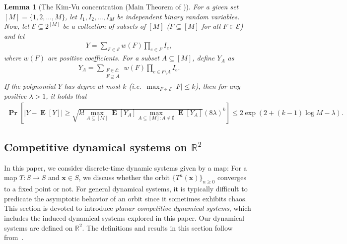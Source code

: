 \documentclass[letterpaper,11pt]{article}
\newtheorem{lemma}[theorem]{Lemma}
\newcommand{\Ind}{I}
\newcommand{\Es}{F}
\renewcommand\Pr{\mathop{\mathbf{Pr}}}
\DeclareMathOperator{\E}{\mathbf{E}}
\begin{document}
\begin{lemma}[The Kim-Vu concentration (Main Theorem of \cite{KV00})] \label{lem:Kim-Vu}
For a given set $[M]=\{1,2, \ldots, M\}$, let $\Ind_1, \Ind_2, \ldots, \Ind_M$ be independent binary random variables.
%
Now, let $\mathcal{E}\subseteq 2^{[M]}$ be a collection of subsets of $[M]$ ($\Es\subseteq [M]$ for all $\Es\in \mathcal{E}$) and let
\begin{align*}
Y=\sum_{\Es\in \mathcal{E}}w(\Es)\prod_{e\in \Es}\Ind_e,
\end{align*}
where $w(\Es)$ are positive coefficients.
%
For a subset $A\subseteq [M]$, define $Y_{A}$ as
\begin{align*}
Y_{A}=\sum_{\substack{\Es\in\mathcal{E}:\\\Es\supseteq A}} w(\Es)\prod_{e\in \Es\setminus A}\Ind_e.
\end{align*}
If the polynomial $Y$ has degree at most $k$ (i.e.~$\max_{F\in\mathcal{E}}|F|\leq k$), then for any positive $\lambda>1$, it holds that
\begin{align*}
\Pr\left[|Y-\E[Y]|\geq \sqrt{k! \max_{A\subseteq [M]}\E[Y_{A}]\max_{A\subseteq [M]:A\neq \emptyset}\E[Y_{A}]}(8\lambda)^k\right]\leq 2\exp(2+(k-1)\log M-\lambda).
\end{align*}
\end{lemma}


%


\subsection[Competitive dynamical systems]{Competitive dynamical systems on $\mathbb{R}^2$} \label{sec:competitive_system}
In this paper, we consider discrete-time dynamic systems given by a map: For a map $T:S\to S$ and $\mathbf{x}\in S$, we discuss whether the orbit $\{T^n(\mathbf{x})\}_{n\geq 0}$ converges to a fixed point or not.
For general dynamical systems, it is typically difficult to predicate the asymptotic behavior of an orbit since it sometimes exhibits chaos.
This section is devoted to introduce \emph{planar competitive dynamical systems}, which includes the induced dynamical systems explored in this paper.
Our dynamical systems are defined on $\mathbb{R}^2$.
The definitions and results in this section follow from~\cite{HS05}.
\end{document}
